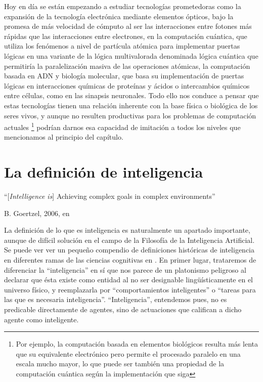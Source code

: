 \documentclass[12pt]{memoir}
\begin{document}
Hoy en día se están empezando a estudiar tecnologías prometedoras como la expansión de la tecnología electrónica mediante elementos ópticos, bajo la promesa de más velocidad de cómputo al ser las interacciones entre fotones más rápidas que las interacciones entre electrones, en la computación cuántica, que utiliza los fenómenos a nivel de partícula atómica para implementar puertas lógicas en una variante de la lógica multivalorada denominada lógica cuántica que permitiría la paralelización masiva de las operaciones atómicas, la computación basada en ADN y biología molecular, que basa su implementación de puertas lógicas en interacciones químicas de proteínas y ácidos o intercambios químicos entre células, como en las sinapsis neuronales. Todo ello nos conduce a pensar que estas tecnologías tienen una relación inherente con la base física o biológica de los seres vivos, y aunque no resulten productivas para los problemas de computación actuales \footnote{Por ejemplo, la computación basada en elementos biológicos resulta más lenta que su equivalente electrónico pero permite el procesado paralelo en una escala mucho mayor, lo que puede ser también una propiedad de la computación cuántica según la implementación que siga} podrían darnos esa capacidad de imitación a todos los niveles que mencionamos al principio del capítulo.

\chapter{La definición de inteligencia}
\label{intelligence}

\epigraph{``[\textit{Intelligence is}] Achieving complex goals in complex environments''}{B. Goertzel, 2006, en \cite{intDefs}}

La definición de lo que es inteligencia es naturalmente un apartado importante, aunque de difícil solución en el campo de la Filosofía de la Inteligencia Artificial. Se puede ver ver un pequeño compendio de definiciones históricas de inteligencia en diferentes ramas de las ciencias cognitivas en \parencite{intDefs}. En primer lugar, trataremos de diferenciar la ``inteligencia'' en sí que nos parece de un platonismo peligroso al declarar que ésta existe como entidad al no ser designable lingüísticamente en el universo físico, y reemplazarla por ``comportamientos inteligentes'' o ``tareas para las que es necesaria inteligencia''. ``Inteligencia'', entendemos pues, no es predicable directamente de agentes, sino de actuaciones que califican a dicho agente como inteligente. 
\end{document}
